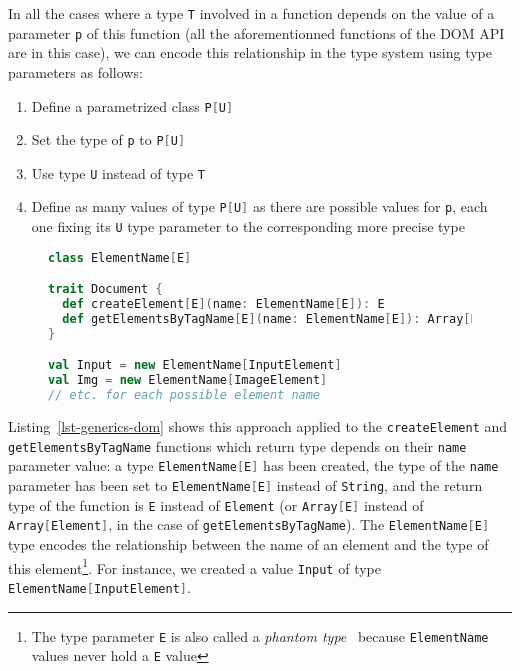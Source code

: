 \documentclass{llncs}
\newcommand{\jscode}[1]{\lstinline[language=JavaScript]|#1|}
\newcommand{\scalacode}[1]{\lstinline[language=Scala]|#1|}
\begin{document}
In all the cases where a type \scalacode{T} involved in a function depends on the value of a parameter \scalacode{p} of this function (all the aforementionned functions of the DOM API are in this case), we can encode this relationship in the type system using type parameters as follows:

\begin{enumerate}
 \item Define a parametrized class \scalacode{P[U]}
 \item Set the type of \scalacode{p} to \scalacode{P[U]}
 \item Use type \scalacode{U} instead of type \scalacode{T}
 \item Define as many values of type \scalacode{P[U]} as there are possible values for \scalacode{p}, each one fixing its \scalacode{U} type parameter to the corresponding more precise type
\end{enumerate}

\begin{figure}
\begin{lstlisting}[label=lst-generics-dom,language=Scala,caption={Encoding of the \jscode{createElement} function using type parameters}]
class ElementName[E]

trait Document {
  def createElement[E](name: ElementName[E]): E
  def getElementsByTagName[E](name: ElementName[E]): Array[E]
}

val Input = new ElementName[InputElement]
val Img = new ElementName[ImageElement]
// etc. for each possible element name
\end{lstlisting}
\end{figure}

Listing~\ref{lst-generics-dom} shows this approach applied to the \jscode{createElement} and \jscode{getElementsByTagName} functions which return type depends on their \jscode{name} parameter value: a type \scalacode{ElementName[E]} has been created, the type of the \scalacode{name} parameter has been set to \scalacode{ElementName[E]} instead of \scalacode{String}, and the return type of the function is \scalacode{E} instead of \scalacode{Element} (or \scalacode{Array[E]} instead of \scalacode{Array[Element]}, in the case of \scalacode{getElementsByTagName}). The \scalacode{ElementName[E]} type encodes the relationship between the name of an element and the type of this element\footnote{The type parameter \scalacode{E} is also called a \emph{phantom type}~\cite{leijen1999domain} because \scalacode{ElementName} values never hold a \scalacode{E} value}. For instance, we created a value \scalacode{Input} of type \scalacode{ElementName[InputElement]}.
\end{document}
